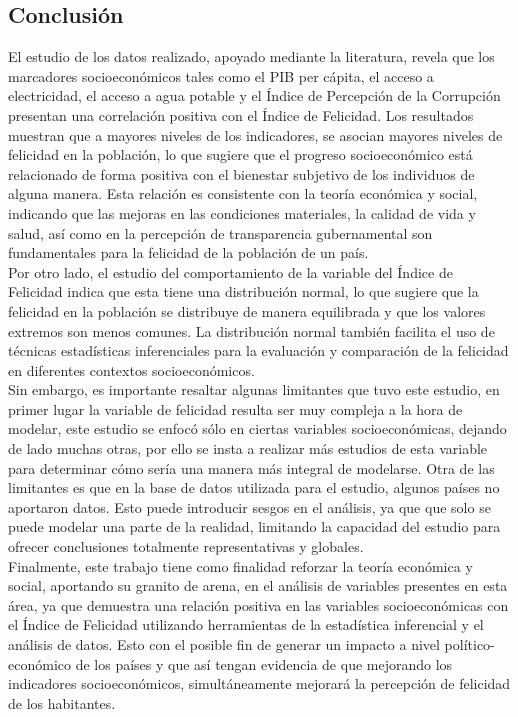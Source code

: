 \subsection{Conclusión}

El estudio de los datos realizado, apoyado mediante la literatura, revela que los marcadores socioeconómicos tales como el PIB per cápita, el acceso a electricidad, el acceso a agua potable y el Índice de Percepción de la Corrupción presentan una correlación positiva con el Índice de Felicidad. Los resultados muestran que a mayores niveles de los indicadores, se asocian mayores niveles de felicidad en la población, lo que sugiere que el progreso socioeconómico está relacionado de forma positiva con el bienestar subjetivo de los individuos de alguna manera. Esta relación es consistente con la teoría económica y social, indicando que las mejoras en las condiciones materiales, la calidad de vida y salud, así como en la percepción de transparencia gubernamental son fundamentales para la felicidad de la población de un país. \\

Por otro lado, el estudio del comportamiento de la variable del Índice de Felicidad indica que esta tiene una distribución normal, lo que sugiere que la felicidad en la población se distribuye de manera equilibrada y que los valores extremos son menos comunes. La distribución normal también facilita el uso de técnicas estadísticas inferenciales para la evaluación y comparación de la felicidad en diferentes contextos socioeconómicos. \\

Sin embargo, es importante resaltar algunas limitantes que tuvo este estudio, en primer lugar la variable de felicidad resulta ser muy compleja a la hora de modelar, este estudio se enfocó sólo en ciertas variables socioeconómicas, dejando de lado muchas otras, por ello se insta a realizar más estudios de esta variable para determinar cómo sería una manera más integral de modelarse. Otra de las limitantes es que en la base de datos utilizada para el estudio, algunos países no aportaron datos. Esto puede introducir sesgos en el análisis, ya que que solo se puede modelar una parte de la realidad, limitando la capacidad del estudio para ofrecer conclusiones totalmente representativas y globales. \\

Finalmente, este trabajo tiene como finalidad reforzar la teoría económica y social, aportando su granito de arena, en el análisis de variables presentes en esta área, ya que demuestra una relación positiva en las variables socioeconómicas con el Índice de Felicidad utilizando herramientas de la estadística inferencial y el análisis de datos. Esto con el posible fin de generar un impacto a nivel político-económico de los países y que así tengan evidencia de que mejorando los indicadores socioeconómicos, simultáneamente mejorará la percepción de felicidad de los habitantes.  
\pagebreak

